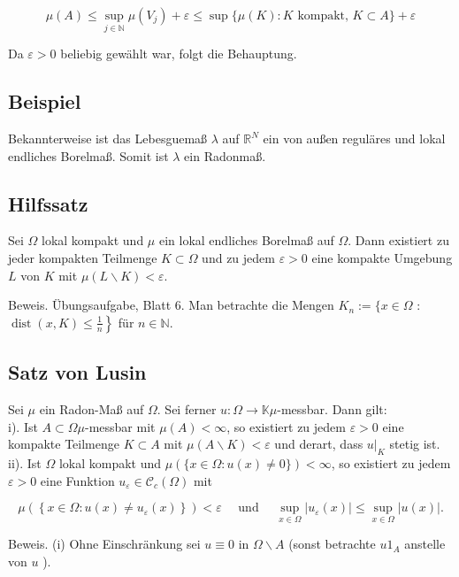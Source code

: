 \documentclass[10pt, letterpaper]{article}
\begin{document}
$$
\mu(A) \leq \sup _{j \in \mathbb{N}} \mu\left(V_{j}\right)+\varepsilon \leq \sup \{\mu(K): K \text { kompakt, } K \subset A\}+\varepsilon
$$

Da $\varepsilon>0$ beliebig gewählt war, folgt die Behauptung.

\subsection*{Beispiel}
Bekannterweise ist das Lebesguemaß $\lambda$ auf $\mathbb{R}^{N}$ ein von außen reguläres und lokal endliches Borelmaß. Somit ist $\lambda$ ein Radonmaß.

\subsection*{Hilfssatz}
Sei $\Omega$ lokal kompakt und $\mu$ ein lokal endliches Borelmaß auf $\Omega$. Dann existiert zu jeder kompakten Teilmenge $K \subset \Omega$ und zu jedem $\varepsilon>0$ eine kompakte Umgebung $L$ von $K$ mit $\mu(L \backslash K)<\varepsilon$.

Beweis. Übungsaufgabe, Blatt 6. Man betrachte die Mengen $K_{n}:=\{x \in \Omega$ : $\left.\operatorname{dist}(x, K) \leq \frac{1}{n}\right\}$ für $n \in \mathbb{N}$.

\subsection*{Satz von Lusin}
Sei $\mu$ ein Radon-Maß auf $\Omega$. Sei ferner $u: \Omega \rightarrow \mathbb{K} \mu$-messbar. Dann gilt:\\
i). Ist $A \subset \Omega \mu$-messbar mit $\mu(A)<\infty$, so existiert zu jedem $\varepsilon>0$ eine kompakte Teilmenge $K \subset A$ mit $\mu(A \backslash K)<\varepsilon$ und derart, dass $\left.u\right|_{K}$ stetig ist.\\
ii). Ist $\Omega$ lokal kompakt und $\mu(\{x \in \Omega: u(x) \neq 0\})<\infty$, so existiert zu jedem $\varepsilon>0$ eine Funktion $u_{\varepsilon} \in \mathcal{C}_{c}(\Omega)$ mit

$$
\mu\left(\left\{x \in \Omega: u(x) \neq u_{\varepsilon}(x)\right\}\right)<\varepsilon \quad \text { und } \quad \sup _{x \in \Omega}\left|u_{\varepsilon}(x)\right| \leq \sup _{x \in \Omega}|u(x)| .
$$

Beweis. (i) Ohne Einschränkung sei $u \equiv 0$ in $\Omega \backslash A$ (sonst betrachte $u 1_{A}$ anstelle von $u$ ).
\end{document}
